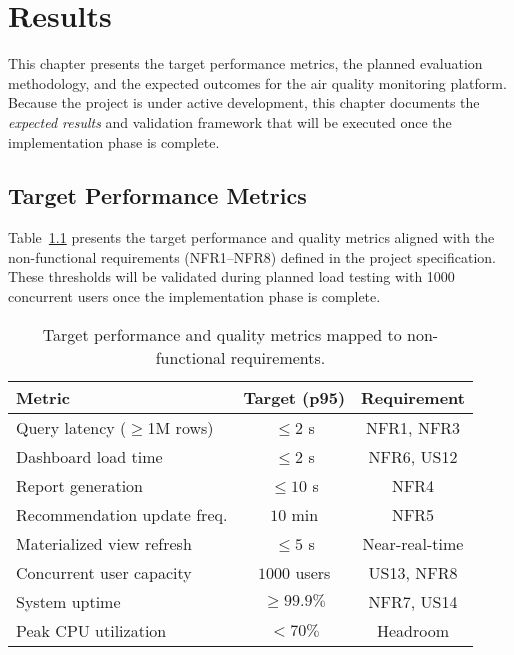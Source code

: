 \chapter{Results}
\label{ch:results}

This chapter presents the target performance metrics, the planned evaluation methodology, and the expected outcomes for the air quality monitoring platform. Because the project is under active development, this chapter documents the \textit{expected results} and validation framework that will be executed once the implementation phase is complete.

\section{Target Performance Metrics}
\label{sec:target_metrics}

Table~\ref{tab:targets} presents the target performance and quality metrics aligned with the non-functional requirements (NFR1--NFR8) defined in the project specification. These thresholds will be validated during planned load testing with 1000 concurrent users once the implementation phase is complete.

\begin{table}[tb]
\centering
\caption{Target performance and quality metrics mapped to non-functional requirements.}
\label{tab:targets}
\begin{tabular}{lcc}
\toprule
\textbf{Metric} & \textbf{Target (p95)} & \textbf{Requirement}\\
\midrule
Query latency ($\geq$1M rows)      & $\leq2$ s        & NFR1, NFR3\\
Dashboard load time           & $\leq2$ s        & NFR6, US12\\
Report generation             & $\leq10$ s       & NFR4\\
Recommendation update freq.   & $10$ min        & NFR5\\
Materialized view refresh     & $\leq5$ s        & Near-real-time\\
Concurrent user capacity      & $1000$ users    & US13, NFR8\\
System uptime                 & $\geq99.9\%$     & NFR7, US14\\
Peak CPU utilization          & $<70\%$         & Headroom\\
\bottomrule
\end{tabular}
\end{table}

